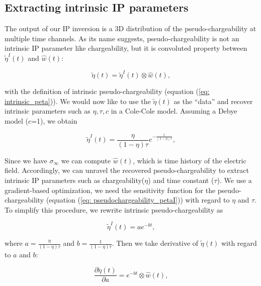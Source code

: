 \documentclass[extra,mreferee]{gji}
\newcommand{\siginf}{\sigma_\infty}
\newcommand{\peta}{\tilde{\eta}}
\begin{document}
\subsection{Extracting intrinsic IP parameters}
\label{section: extract_intrinsicIP}
The output of our IP inversion is a 3D distribution of the pseudo-chargeability at multiple time channels. 
As its name suggests, pseudo-chargeability is not an intrinsic IP parameter like chargeability, but it is convoluted property between $\peta^{I}(t)$ and $\hat{w}(t)$:
\begin{linenomath*}
\begin{equation}
  \peta(t) = \peta^{I}(t) \otimes \hat{w}(t),
  \label{eq: pseudochargeability_petaI}
\end{equation}
\end{linenomath*}
with the definition of intrinsic pseudo-chargeability (equation (\ref{eq: intrinsic_peta})).
We would now like to use the $\peta(t)$ as the “data” and recover intrinsic parameters such as $\eta, \tau, c$ in a Cole-Cole model. Assuming a Debye model ($c$=1), we obtain
\begin{linenomath*}
\begin{equation}
    \peta^{I}(t) = \frac{\eta}{(1-\eta)\tau}e^{-\frac{t}{(1-\eta)\tau}},
    \label{eq: intrinsic_peta_debye}
\end{equation}
\end{linenomath*}
Since we have $\siginf$ we can compute $\hat{w}(t)$, which is time history of the electric field. 
Accordingly, we can unravel the recovered pseudo-chargeability to extract intrinsic IP parameters such as chargeability($\eta$) and time constant ($\tau$). 
We use a gradient-based optimization, we need the sensitivity function for the pseudo-chargeability (equation (\ref{eq: pseudochargeability_petaI})) with regard to $\eta$ and $\tau$. 
To simplify this procedure, we rewrite intrinsic pseudo-chargeability as 
\begin{linenomath*}
\begin{equation}
  \peta^{I}(t) = a e^{-bt},
\end{equation}
\end{linenomath*}
where $a = \frac{\eta}{(1-\eta)\tau}$ and $b = \frac{1}{(1-\eta)\tau}$. 
Then we take derivative of $\peta(t)$ with regard to $a$ and $b$:
\begin{linenomath*}
\begin{equation}
  \frac{\partial \peta(t)}{\partial a} = e^{-bt} \otimes \hat{w}(t),
\end{equation}
\end{linenomath*}
\end{document}
